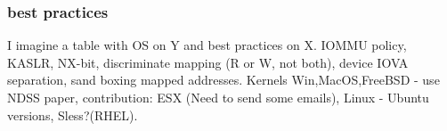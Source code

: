 \subsubsection{best practices}
I imagine a table with OS on Y and best practices on X.
IOMMU policy, KASLR, NX-bit, discriminate mapping (R or W, not both), device IOVA separation, sand boxing mapped addresses.
Kernels Win,MacOS,FreeBSD - use NDSS paper, contribution: ESX (Need to send some emails), Linux - Ubuntu versions, Sless?(RHEL).